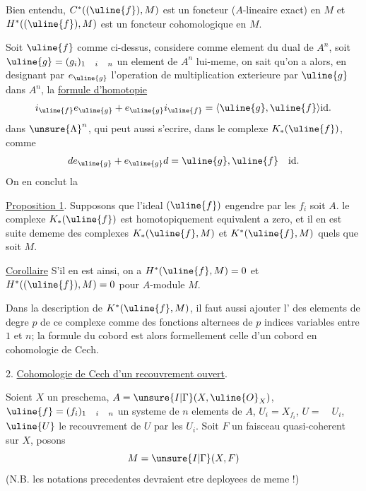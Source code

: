 Bien entendu, $C^*((\uline{f}),M)$ est un foncteur  ($A$-lineaire exact) en $M$ et $H^*((\uline{f}),M)$ est un foncteur cohomologique en $M$.

Soit $\uline{f}$ comme ci-dessus,  considere comme element du dual de $A^n$, soit $\uline{g}=(g_i)_{1\quad i\quad n}$ un element de $A^n$ lui-meme, on sait qu'on a alors, en designant par $e_{\uline{g}}$ l'operation de multiplication exterieure par $\uline{g}$ dans $A^n$, la \uline{formule d'homotopie}
\[
i_{\uline{f}}e_{\uline{g}}+e_{\uline{g}}i_{\uline{f}}=\langle\uline{g},\uline{f}\rangle\mathrm{id}.
\]
dans $\unsure{\Lambda}^{n}$, qui peut aussi s'ecrire, dans le complexe $K_*(\uline{f})$, comme
\[
de_{\uline{g}}+e_{\uline{g}}d=\uline{g},\uline{f}\quad\mathrm{id}.
\]
On en conclut la

\uline{Proposition 1}. Supposons que l'ideal $(\uline{f})$ engendre par les $f_i$ soit $A$.  le complexe $K_*(\uline{f})$ est homotopiquement equivalent a zero, et il en est  suite dememe des complexes $K_*(\uline{f},M)$ et $K^*(\uline{f},M)$ quels que soit $M$.

\uline{Corollaire} S'il en est ainsi, on a $H^*(\uline{f},M)=0$ et $H^*((\uline{f}),M)=0$ pour  $A$-module $M$.

Dans la description de $K^*(\uline{f},M)$, il faut aussi ajouter l' des elements de degre $p$ de ce complexe comme des fonctions alternees de $p$ indices variables entre $1$ et $n$; la formule du cobord est alors formellement celle d'un cobord en cohomologie de Cech.

2. \uline{Cohomologie de Cech d'un recouvrement ouvert}.

Soient $X$ un preschema, $A=\unsure{I|\Gamma}(X,\uline{O}_X)$, $\uline{f}=(f_i)_{1\quad i\quad n}$ un systeme de $n$ elements de $A$, $U_i=X_{f_i}$, $U=\quad U_i$, $\uline{U}$ le recouvrement de $U$ par les $U_i$. Soit $F$ un faisceau quasi-coherent sur $X$, posons
\[
M=\unsure{I|\Gamma}(X,F)
\]
(N.B. les notations precedentes devraient etre deployees de meme !)


